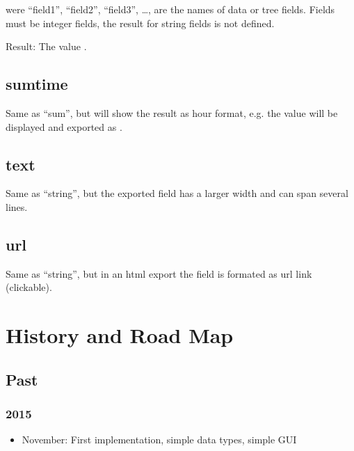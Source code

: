\documentclass[letterpaper,10pt,english]{sphinxmanual}
\begin{document}
\sphinxAtStartPar
were “field1”, “field2”, “field3”, …, are the names of data or tree fields. Fields must be integer fields, the result for string fields is not defined.

\sphinxAtStartPar
Result: The value .


\section{sum\sphinxhyphen{}time}
\label{\detokenize{tree-fields:sum-time}}
\sphinxAtStartPar
Same as “sum”, but will show the result as hour format, e.g. the value  will be displayed and exported as .


\section{text}
\label{\detokenize{tree-fields:text}}
\sphinxAtStartPar
Same as “string”, but the exported field has a larger width and can span several lines.


\section{url}
\label{\detokenize{tree-fields:url}}
\sphinxAtStartPar
Same as “string”, but in an html export the field is formated as url link (clickable).

\sphinxstepscope


\chapter{History and Road Map}
\label{\detokenize{releases:history-and-road-map}}\label{\detokenize{releases::doc}}

\section{Past}
\label{\detokenize{releases:past}}

\subsection{2015}
\label{\detokenize{releases:id1}}\begin{itemize}
\item {} 
\sphinxAtStartPar
November: First implementation, simple data types, simple GUI

\end{itemize}
\end{document}
